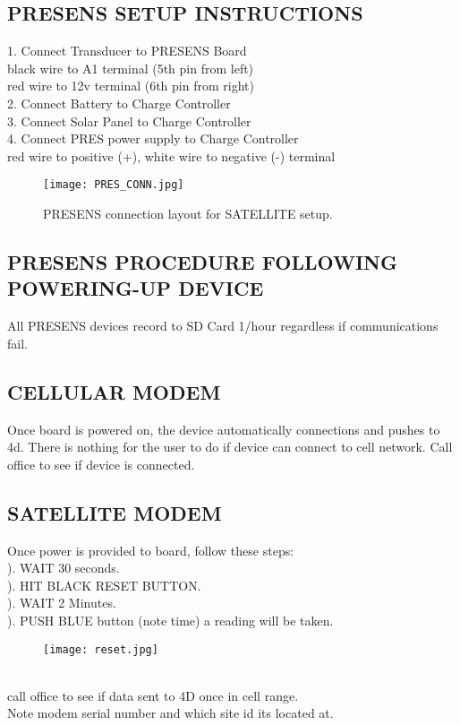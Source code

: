 \documentclass[11pt]{article}
\newcommand\tab[1][1cm]{\hspace*{#1}} %
\begin{document}
\subsection*{PRESENS SETUP INSTRUCTIONS}

 1. Connect Transducer to PRESENS Board\\
\tab  black wire to A1 terminal (5th pin from left)\\
\tab red wire to 12v terminal  (6th pin from right)\\
2. Connect Battery to Charge Controller\\
3. Connect Solar Panel to Charge Controller\\
4. Connect PRES power supply to Charge Controller\\
\tab red wire to positive (+), white wire to negative (-) terminal\\

\begin{figure}[h!]	%
\centering
\captionsetup{justification=centering}%
\texttt{[image: PRES\_CONN.jpg]}\\
\caption{PRESENS connection layout for SATELLITE setup.}
\end{figure}

\newpage
\subsection*{PRESENS PROCEDURE FOLLOWING POWERING-UP DEVICE}
\noindent All PRESENS devices record to SD Card 1/hour regardless if communications fail.
\subsection*{CELLULAR MODEM}
\noindent Once board is powered on, the device automatically connections and pushes to 4d. There is nothing for the user to do if device can connect to cell network. Call office to see if device is connected.\\
\subsection*{SATELLITE MODEM }
\noindent Once power is provided to board, follow these steps:\\
). WAIT 30 seconds.\\
). HIT BLACK RESET BUTTON.\\
). WAIT 2 Minutes.\\
). PUSH BLUE button (note time) a reading will be taken.\\
\begin{figure}[h!]	%
\centering
\captionsetup{justification=centering}%
\texttt{[image: reset.jpg]}\\
\end{figure}\\
\noindent call office to see if data sent to 4D once in cell range.\\
\noindent Note modem serial number and which site id its located at.
\end{document}
